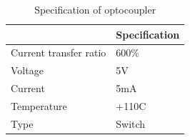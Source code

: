 \begin{table}[H]
\centering
\caption{Specification of optocoupler}
\begin{tabular}{|l|l|}
\hline
\multicolumn{1}{|c|}{\cellcolor[HTML]{FFFFFF}{\color[HTML]{333333} \textbf{Characteristics}}} & \textbf{Specification} \\ \hline
Current transfer ratio                                                                        & 600\%                  \\ \hline
Voltage                                                                                       & 5V                     \\ \hline
Current                                                                                       & 5mA                    \\ \hline
Temperature                                                                                   & +110C                  \\ \hline
Type                                                                                          & Switch                 \\ \hline
\end{tabular}
\end{table}

